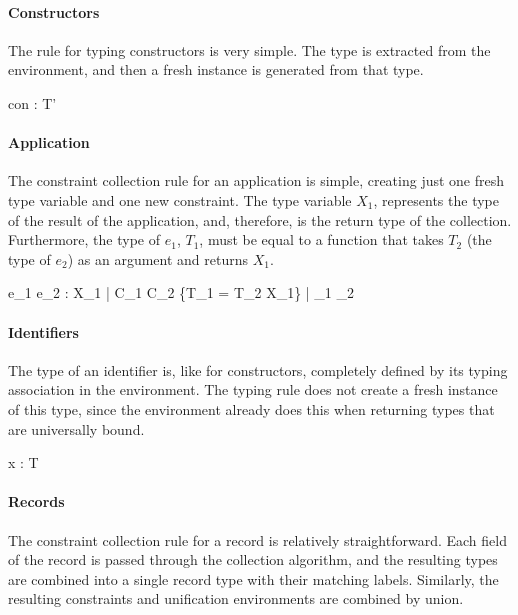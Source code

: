 \documentclass[class=article, crop=false]{standalone}
\begin{document}
\paragraph{Constructors}

The rule for typing constructors is very simple.
The type is extracted from the environment, and then a fresh instance is generated from that type.

    {\Gamma \vdash con : T'}

\paragraph{Application}

The constraint collection rule for an application is simple, creating just one fresh type variable and one new constraint.
The type variable $X_1$, represents the type of the result of the application, and, therefore, is the return type of the collection.
Furthermore, the type of $e_1$, $T_1$, must be equal to a function that takes $T_2$ (the type of $e_2$) as an argument and returns $X_1$.

    {\Gamma \vdash e_1 \; e_2 : X_1 \; | \; C_1 \cup C_2 \cup \{T_1 = T_2 \rightarrow X_1\} \; | \; \gamma_1 \cup \gamma_2}

\paragraph{Identifiers}

The type of an identifier is, like for constructors, completely defined by its typing association in the environment.
The typing rule does not create a fresh instance of this type, since the environment already does this when returning types that are universally bound.

    {\Gamma \vdash x : T}

\paragraph{Records}

The constraint collection rule for a record is relatively straightforward.
Each field of the record is passed through the collection algorithm, and the resulting types are combined into a single record type with their matching labels.
Similarly, the resulting constraints and unification environments are combined by union.
\end{document}
